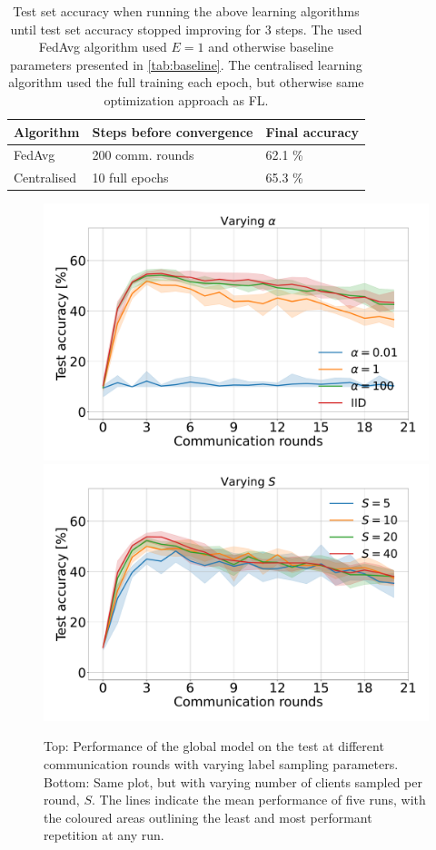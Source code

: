\documentclass{article}
\begin{document}
\begin{table}[htb!]
    \centering
        \begin{tabular}{lll}
            Algorithm & Steps before convergence & Final accuracy\\
            \hline
            FedAvg & 200 comm. rounds & 62.1 \%\\
            Centralised & 10 full epochs & 65.3 \%
        \end{tabular}
    \caption{
        Test set accuracy when running the above learning algorithms until test set accuracy stopped improving for 3 steps.
        The used FedAvg algorithm used $E=1$ and otherwise baseline parameters presented in \ref{tab:baseline}.
        The centralised learning algorithm used the full training each epoch, but otherwise same optimization approach as FL.
    }
    \label{app:centralised}
\end{table}\noindent
\begin{figure}[htb!]
    \centering
    \includegraphics[width=\linewidth]{imgs/alphas.pdf}
    \includegraphics[width=\linewidth]{imgs/S.pdf}
    \caption{Top: Performance of the global model on the test at different communication rounds with varying label sampling parameters. Bottom: Same plot, but with varying number of clients sampled per round, $S$.
    The lines indicate the mean performance of five runs, with the coloured areas outlining the least and most performant repetition at any run.}
    \label{fig:alpha-s}
\end{figure}\noindent
\end{document}
